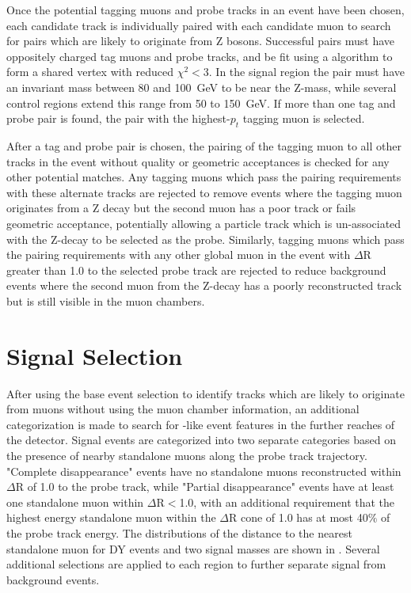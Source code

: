 Once the potential tagging muons and probe tracks in an event have been chosen, each candidate track is individually paired with each candidate muon to search for pairs which are likely to originate from Z bosons.
Successful pairs must have oppositely charged tag muons and probe tracks, and be fit using a \kf algorithm to form a shared vertex with reduced $\chi^2<$3.
In the signal region the pair must have an invariant mass between 80 and \SI{100}{\giga\eV} to be near the Z-mass, while several control regions extend this range from 50 to \SI{150}{\giga\eV}.
If more than one tag and probe pair is found, the pair with the highest-$p_t$ tagging muon is selected.

After a tag and probe pair is chosen, the pairing of the tagging muon to all other tracks in the event without quality or geometric acceptances is checked for any other potential matches.
Any tagging muons which pass the pairing requirements with these alternate tracks are rejected to remove events where the tagging muon originates from a Z decay but the second muon has a poor track or fails geometric acceptance, potentially allowing a particle track which is un-associated with the Z-decay to be selected as the probe.
Similarly, tagging muons which pass the pairing requirements with any other global muon in the event with $\Delta$R greater than 1.0 to the selected probe track are rejected to reduce background events where the second muon from the Z-decay has a poorly reconstructed track but is still visible in the muon chambers.

\section{Signal Selection}
After using the base event selection to identify tracks which are likely to originate from muons without using the muon chamber information, an additional categorization is made to search for \dbrem-like event features in the further reaches of the detector.
Signal events are categorized into two separate categories based on the presence of nearby standalone muons along the probe track trajectory.
"Complete disappearance" events have no standalone muons reconstructed within $\Delta$R of 1.0 to the probe track, while "Partial disappearance" events have at least one standalone muon within $\Delta$R$<$1.0, with an additional requirement that the highest energy standalone muon within the $\Delta$R cone of 1.0 has at most 40$\%$ of the probe track energy.
The distributions of the distance to the nearest standalone muon for DY events and two signal masses are shown in .
Several additional selections are applied to each region to further separate signal from background events.

